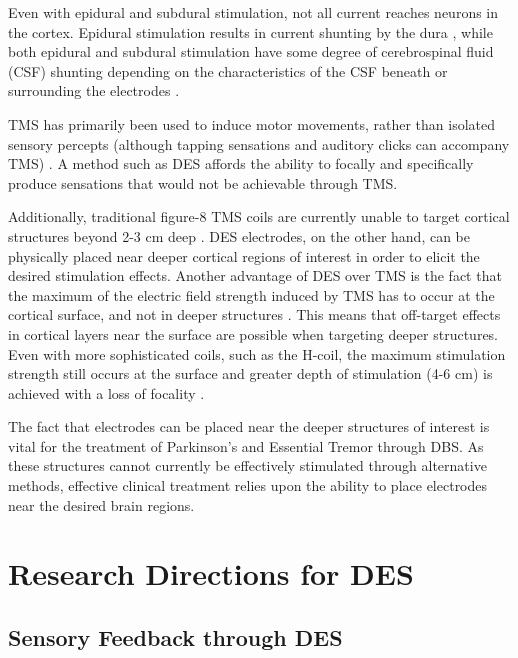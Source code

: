Even with epidural and subdural stimulation, not all current reaches neurons in the cortex. Epidural stimulation results in current shunting by the dura \cite{Wongsarnpigoon2008}, while both epidural and subdural stimulation have some degree of cerebrospinal fluid (CSF) shunting depending on the characteristics of the CSF beneath or surrounding the electrodes \cite{Wongsarnpigoon2008,Guler2018}. 

TMS has primarily been used to induce motor movements, rather than isolated sensory percepts (although tapping sensations and auditory clicks can accompany TMS) \cite{Sliwinska2014}. A method such as DES affords the ability to focally and specifically produce sensations that would not be achievable through TMS. 

Additionally, traditional figure-8 TMS coils are currently unable to target cortical structures beyond 2-3 cm deep \cite{Wagner2009,Roth1991}. DES electrodes, on the other hand, can be physically placed near deeper cortical regions of interest in order to elicit the desired stimulation effects. Another advantage of DES over TMS is the fact that the maximum of the electric field strength induced by TMS has to occur at the cortical surface, and not in deeper structures \cite{Heller1992}. This means that off-target effects in cortical layers near the surface are possible when targeting deeper structures. Even with more sophisticated coils, such as the H-coil, the maximum stimulation strength still occurs at the surface and greater depth of stimulation (4-6 cm) is achieved with a loss of focality \cite{Wagner2009,Zangen2005}. 

The fact that electrodes can be placed near the deeper structures of interest is vital for the treatment of Parkinson’s and Essential Tremor through DBS. As these structures cannot currently be effectively stimulated through alternative methods, effective clinical treatment relies upon the ability to place electrodes near the desired brain regions.  

\section{Research Directions for DES}

\subsection{Sensory Feedback through DES}

